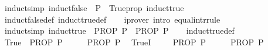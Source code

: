 \begin{isabellebody}
%
\endisatagproof
{\isafoldproof}%
%
\isadelimproof
\isanewline
%
\endisadelimproof
\isanewline
{}\isamarkupfalse%
\ {\isacharbrackleft}{\kern0pt}induct{\isacharunderscore}{\kern0pt}simp{\isacharbrackright}{\kern0pt}{\isacharcolon}{\kern0pt}\ {\isachardoublequoteopen}{\isacharparenleft}{\kern0pt}induct{\isacharunderscore}{\kern0pt}false\ {\isasymLongrightarrow}\ P{\isacharparenright}{\kern0pt}\ {\isasymequiv}\ Trueprop\ induct{\isacharunderscore}{\kern0pt}true{\isachardoublequoteclose}\isanewline
%
\isadelimproof
\ \ %
\endisadelimproof
%
\isatagproof
{}\isamarkupfalse%
\ induct{\isacharunderscore}{\kern0pt}false{\isacharunderscore}{\kern0pt}def\ induct{\isacharunderscore}{\kern0pt}true{\isacharunderscore}{\kern0pt}def\isanewline
\ \ \isamarkupfalse%
\ {\isacharparenleft}{\kern0pt}iprover\ intro{\isacharcolon}{\kern0pt}\ equal{\isacharunderscore}{\kern0pt}intr{\isacharunderscore}{\kern0pt}rule{\isacharparenright}{\kern0pt}%
\endisatagproof
{\isafoldproof}%
%
\isadelimproof
\isanewline
%
\endisadelimproof
\isanewline
{}\isamarkupfalse%
\ {\isacharbrackleft}{\kern0pt}induct{\isacharunderscore}{\kern0pt}simp{\isacharbrackright}{\kern0pt}{\isacharcolon}{\kern0pt}\ {\isachardoublequoteopen}{\isacharparenleft}{\kern0pt}induct{\isacharunderscore}{\kern0pt}true\ {\isasymLongrightarrow}\ PROP\ P{\isacharparenright}{\kern0pt}\ {\isasymequiv}\ PROP\ P{\isachardoublequoteclose}\isanewline
%
\isadelimproof
\ \ %
\endisadelimproof
%
\isatagproof
{}\isamarkupfalse%
\ induct{\isacharunderscore}{\kern0pt}true{\isacharunderscore}{\kern0pt}def\isanewline
{}\isamarkupfalse%
\isanewline
\ \ \isamarkupfalse%
\ {\isachardoublequoteopen}True\ {\isasymLongrightarrow}\ PROP\ P{\isachardoublequoteclose}\isanewline
\ \ \isamarkupfalse%
\ \isamarkupfalse%
\ {\isachardoublequoteopen}PROP\ P{\isachardoublequoteclose}\ \isamarkupfalse%
\ TrueI\ \isacommand{{\isachardot}{\kern0pt}}\isamarkupfalse%
\isanewline
{}\isamarkupfalse%
\isanewline
\ \ \isamarkupfalse%
\ {\isachardoublequoteopen}PROP\ P{\isachardoublequoteclose}\isanewline
\ \ \isamarkupfalse%
\ \isamarkupfalse%
\ {\isachardoublequoteopen}PROP\ P{\isachardoublequoteclose}\ \isacommand{{\isachardot}{\kern0pt}}\isamarkupfalse%
\isanewline
{}\isamarkupfalse%
%
\endisatagproof
{\isafoldproof}%
%
\isadelimproof
\isanewline
%
\endisadelimproof
\isanewline
{}\isamarkupfalse%

\end{isabellebody}
